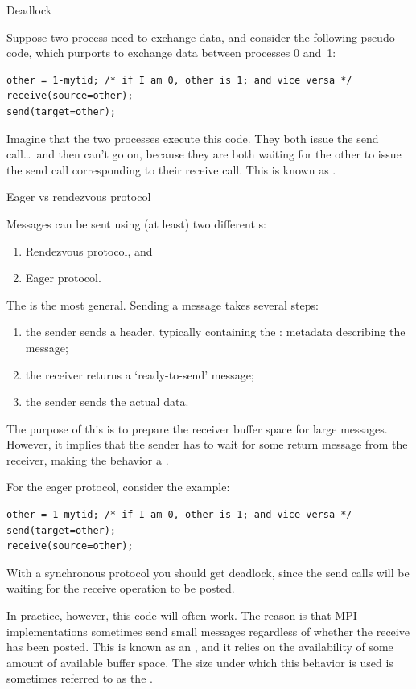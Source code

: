  {Deadlock}

Suppose two process need to exchange data, and consider the following
pseudo-code, which purports to exchange data between processes 0 and~1:
\begin{lstlisting}
other = 1-mytid; /* if I am 0, other is 1; and vice versa */
receive(source=other);
send(target=other);
\end{lstlisting}
Imagine that the two processes execute this code. They both issue the
send call\ldots\ and then can't go on, because they are both waiting
for the other to issue the send call corresponding to their receive call.
This is known as .

 {Eager vs rendezvous protocol}
\label{sec:eager-limit}

Messages can be sent using (at least) two different
s:
\begin{enumerate}
\item Rendezvous protocol, and
\item Eager protocol.
\end{enumerate}
The  is the most general.
Sending a message takes several steps:
\begin{enumerate}
\item the sender sends a header,
  typically containing the :
  metadata describing the message;
\item the receiver returns a `ready-to-send' message;
\item the sender sends the actual data.
\end{enumerate}
The purpose of this is to prepare the receiver buffer space
for large messages. However, it implies that the sender has to
wait for some return message from the receiver,
making the behavior a .

For the eager protocol, consider the example:
\begin{lstlisting}
other = 1-mytid; /* if I am 0, other is 1; and vice versa */
send(target=other);
receive(source=other);
\end{lstlisting}
With a synchronous protocol you should get deadlock,
since the send calls will be waiting for the receive operation to be posted.

In practice, however, this code will often work. The reason is that
MPI implementations sometimes send small messages regardless of whether
the receive has been posted. This is known as an ,
and it relies on the availability of
some amount of available buffer space. The size under which this behavior
is used is sometimes referred to as the .


